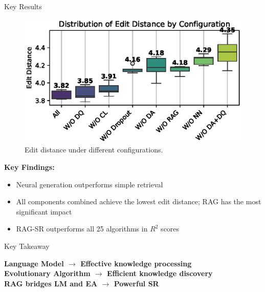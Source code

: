 \documentclass[final]{beamer}
\newcommand{\hlmodern}[1]{\textcolor{modernhighlight}{#1}}
\newcommand{\hlblue}[1]{\textcolor{mainblue}{#1}}
\newcommand{\hlpurple}[1]{\textcolor{deepplum}{#1}}
\newcommand{\hlorange}[1]{\textcolor{warmorange}{#1}}
\newcommand{\hlcharred}[1]{\textcolor{charredred}{#1}}
\newlength{\onecolwid}
\begin{document}
\begin{frame}[t]
\begin{columns}[t]
\begin{column}{\onecolwid}
\begin{block}{Key Results}
                    \begin{minipage}[t]{0.48\linewidth}
                        \begin{figure}
                            \centering
                            \includegraphics[width=\linewidth]{figs/ablation_study_accuracy_10.eps}
                            \caption{Edit distance under different configurations.}
                        \end{figure}
                    \end{minipage}
                    \hfill
                    \begin{minipage}[t]{0.48\linewidth}
                        \vspace*{.5cm}
                        \textbf{\hlblue{Key Findings:}}
                        \begin{itemize}
                            \item \hlpurple{Neural generation outperforms simple retrieval}
                            \item \hlcharred{All components combined achieve the lowest edit distance; RAG has the most significant impact}
                            \item \hlorange{RAG-SR outperforms all 25 algorithms in $R^2$ scores}
                        \end{itemize}
                    \end{minipage}

                    \begin{block}{Key Takeaway}
                        \begin{center}
                            \textbf{\hlmodern{Language Model} $\rightarrow$ \hlmodern{Effective knowledge processing}}\\[1ex]
                            \textbf{\hlmodern{Evolutionary Algorithm} $\rightarrow$ \hlmodern{Efficient knowledge discovery}}\\[1ex]
                            \textbf{\hlmodern{RAG bridges LM and EA} $\rightarrow$ \hlmodern{Powerful SR}}
                        \end{center}
                    \end{block}


\end{block}
\end{column}
\end{columns}
\end{frame}
\end{document}
